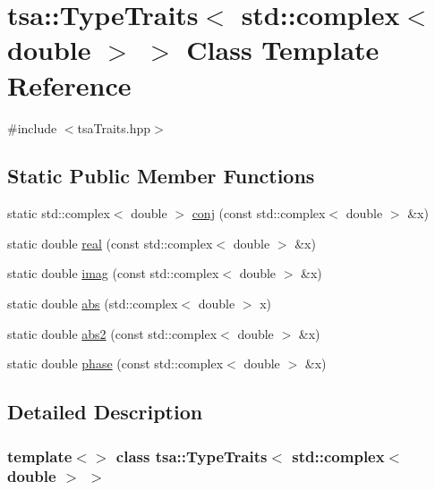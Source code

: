 \hypertarget{classtsa_1_1_type_traits_3_01std_1_1complex_3_01double_01_4_01_4}{}\section{tsa\+:\+:Type\+Traits$<$ std\+:\+:complex$<$ double $>$ $>$ Class Template Reference}
\label{classtsa_1_1_type_traits_3_01std_1_1complex_3_01double_01_4_01_4}


{\ttfamily \#include $<$tsa\+Traits.\+hpp$>$}

\subsection*{Static Public Member Functions}
\begin{DoxyCompactItemize}
\item 
static std\+::complex$<$ double $>$ \hyperlink{classtsa_1_1_type_traits_3_01std_1_1complex_3_01double_01_4_01_4_a9eced3592f7dafac90d6f7d6aa9bca66}{conj} (const std\+::complex$<$ double $>$ \&x)
\item 
static double \hyperlink{classtsa_1_1_type_traits_3_01std_1_1complex_3_01double_01_4_01_4_ab79705afcbcb0c504ecd924f57c1ed49}{real} (const std\+::complex$<$ double $>$ \&x)
\item 
static double \hyperlink{classtsa_1_1_type_traits_3_01std_1_1complex_3_01double_01_4_01_4_a6bf03301824846b16d9927ab5d841ed4}{imag} (const std\+::complex$<$ double $>$ \&x)
\item 
static double \hyperlink{classtsa_1_1_type_traits_3_01std_1_1complex_3_01double_01_4_01_4_ad25e2572dee56a68dde04217087b95ad}{abs} (std\+::complex$<$ double $>$ x)
\item 
static double \hyperlink{classtsa_1_1_type_traits_3_01std_1_1complex_3_01double_01_4_01_4_aff1b7714042e772177e6031c9df77e34}{abs2} (const std\+::complex$<$ double $>$ \&x)
\item 
static double \hyperlink{classtsa_1_1_type_traits_3_01std_1_1complex_3_01double_01_4_01_4_ae96f4d0c1512efbf11bfb92907115431}{phase} (const std\+::complex$<$ double $>$ \&x)
\end{DoxyCompactItemize}


\subsection{Detailed Description}
\subsubsection*{template$<$$>$\newline
class tsa\+::\+Type\+Traits$<$ std\+::complex$<$ double $>$ $>$}



